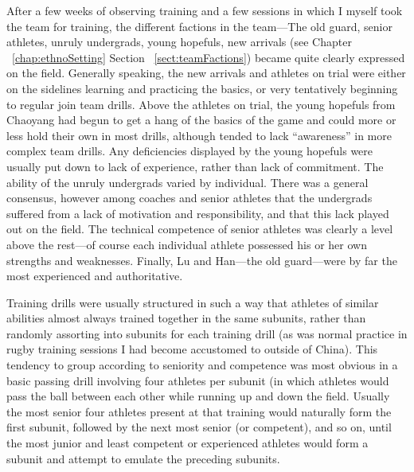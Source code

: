 \begin{CJK}{UTF8}{gbsn}
After a few weeks of observing training and a few sessions in which I myself took the team for training, the different factions in the team---The old guard, senior athletes, unruly undergrads, young hopefuls, new arrivals (see Chapter ~\ref{chap:ethnoSetting} Section ~\ref{sect:teamFactions}) became quite clearly expressed on the field.  Generally speaking, the new arrivals and athletes on trial were either on the sidelines learning and practicing the basics, or very tentatively beginning to regular join team drills. Above the athletes on trial, the young hopefuls from Chaoyang had begun to get a hang of the basics of the game and could more or less hold their own in most drills, although tended to lack ``awareness'' in more complex team drills.  Any deficiencies displayed by the young hopefuls were usually put down to lack of experience, rather than lack of commitment.  The ability of the unruly undergrads varied by individual. There was a general consensus, however among coaches and senior athletes that the undergrads suffered from a lack of motivation and responsibility, and that this lack played out on the field.  The technical competence of senior athletes was clearly a level above the rest---of course each individual athlete possessed his or her own strengths and weaknesses.  Finally, Lu and Han---the old guard---were by far the most experienced and authoritative.

Training drills were usually structured in such a way that athletes of similar abilities almost always trained together in the same subunits, rather than randomly assorting into subunits for each training drill (as was normal practice in rugby training sessions I had become accustomed to outside of China).  This tendency to group according to seniority and competence was most obvious in a basic passing drill involving four athletes per subunit (in which athletes would pass the ball between each other while running up and down the field.  Usually the most senior four athletes present at that training would naturally form the first subunit, followed by the next most senior (or competent), and so on, until the most junior and least competent or experienced athletes would form a subunit and attempt to emulate the preceding subunits.


\end{CJK}
